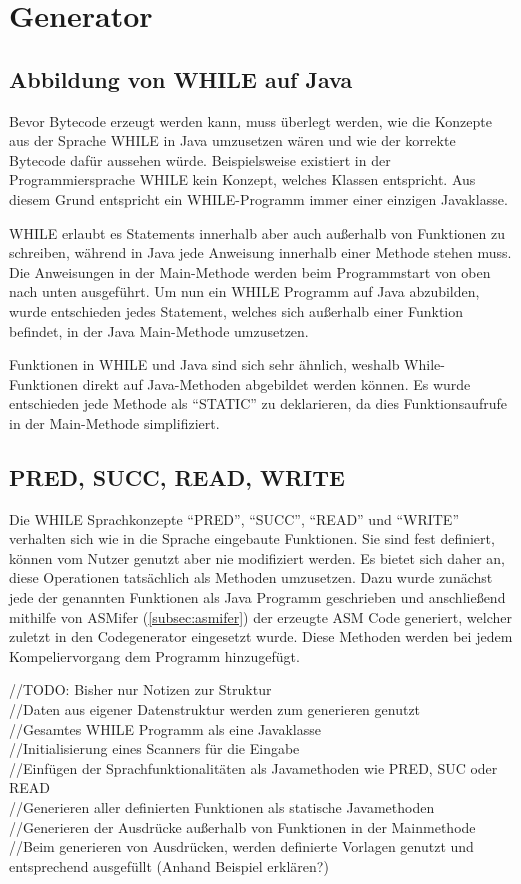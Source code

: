 \section{Generator}

\subsection{Abbildung von WHILE auf Java}

Bevor Bytecode erzeugt werden kann, muss überlegt werden, wie die Konzepte aus der Sprache WHILE in Java umzusetzen wären und wie der korrekte Bytecode dafür aussehen würde. Beispielsweise existiert in der Programmiersprache WHILE kein Konzept, welches Klassen entspricht. Aus diesem Grund entspricht ein WHILE-Programm immer einer einzigen Javaklasse.

WHILE erlaubt es Statements innerhalb aber auch außerhalb von Funktionen zu schreiben, während in Java jede Anweisung innerhalb einer Methode stehen muss. Die Anweisungen in der Main-Methode werden beim Programmstart von oben nach unten ausgeführt. Um nun ein WHILE Programm auf Java abzubilden, wurde entschieden jedes Statement, welches sich außerhalb einer Funktion befindet, in der Java Main-Methode umzusetzen. 

Funktionen in WHILE und Java sind sich sehr ähnlich, weshalb While-Funktionen direkt auf Java-Methoden abgebildet werden können. Es wurde entschieden jede Methode als \enquote{STATIC} zu deklarieren, da dies Funktionsaufrufe in der Main-Methode simplifiziert.

\subsection{PRED, SUCC, READ, WRITE}
Die WHILE Sprachkonzepte \enquote{PRED}, \enquote{SUCC}, \enquote{READ} und \enquote{WRITE} verhalten sich wie in die Sprache eingebaute Funktionen. Sie sind fest definiert, können vom Nutzer genutzt aber nie modifiziert werden. Es bietet sich daher an, diese Operationen tatsächlich als Methoden umzusetzen. Dazu wurde zunächst jede der genannten Funktionen als Java Programm geschrieben und anschließend mithilfe von ASMifer (\cref{subsec:asmifer}) der erzeugte ASM Code generiert, welcher zuletzt in den Codegenerator eingesetzt wurde. Diese Methoden werden bei jedem Kompeliervorgang dem Programm hinzugefügt.

//TODO: Bisher nur Notizen zur Struktur \\
//Daten aus eigener Datenstruktur werden zum generieren genutzt \\
//Gesamtes WHILE Programm als eine Javaklasse \\
//Initialisierung eines Scanners für die Eingabe \\
//Einfügen der Sprachfunktionalitäten als Javamethoden wie PRED, SUC oder READ \\
//Generieren aller definierten Funktionen als statische Javamethoden \\
//Generieren der Ausdrücke außerhalb von Funktionen in der Mainmethode \\
//Beim generieren von Ausdrücken, werden definierte Vorlagen genutzt und entsprechend ausgefüllt (Anhand Beispiel erklären?)